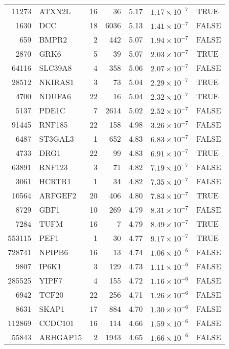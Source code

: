 \begin{table}[ht]
\begin{tabular}{rlrrrrl}
  11273 & ATXN2L &  16 &  36 & 5.17 & $1.17 \times 10^{-7}$ & TRUE \\ 
  1630 & DCC &  18 & 6036 & 5.13 & $1.41 \times 10^{-7}$ & FALSE \\ 
  659 & BMPR2 &   2 & 442 & 5.07 & $1.94 \times 10^{-7}$ & FALSE \\ 
  2870 & GRK6 &   5 &  39 & 5.07 & $2.03 \times 10^{-7}$ & TRUE \\ 
  64116 & SLC39A8 &   4 & 358 & 5.06 & $2.07 \times 10^{-7}$ & FALSE \\ 
  28512 & NKIRAS1 &   3 &  73 & 5.04 & $2.29 \times 10^{-7}$ & TRUE \\ 
  4700 & NDUFA6 &  22 &  16 & 5.04 & $2.32 \times 10^{-7}$ & TRUE \\ 
  5137 & PDE1C &   7 & 2614 & 5.02 & $2.52 \times 10^{-7}$ & FALSE \\ 
  91445 & RNF185 &  22 & 158 & 4.98 & $3.26 \times 10^{-7}$ & FALSE \\ 
  6487 & ST3GAL3 &   1 & 652 & 4.83 & $6.83 \times 10^{-7}$ & FALSE \\ 
  4733 & DRG1 &  22 &  99 & 4.83 & $6.91 \times 10^{-7}$ & TRUE \\ 
  63891 & RNF123 &   3 &  71 & 4.82 & $7.19 \times 10^{-7}$ & FALSE \\ 
  3061 & HCRTR1 &   1 &  34 & 4.82 & $7.35 \times 10^{-7}$ & FALSE \\ 
  10564 & ARFGEF2 &  20 & 406 & 4.80 & $7.83 \times 10^{-7}$ & TRUE \\ 
  8729 & GBF1 &  10 & 269 & 4.79 & $8.31 \times 10^{-7}$ & FALSE \\ 
  7284 & TUFM &  16 &   7 & 4.79 & $8.49 \times 10^{-7}$ & TRUE \\ 
  553115 & PEF1 &   1 &  30 & 4.77 & $9.17 \times 10^{-7}$ & TRUE \\ 
  728741 & NPIPB6 &  16 &  13 & 4.74 & $1.06 \times 10^{-6}$ & FALSE \\ 
  9807 & IP6K1 &   3 & 129 & 4.73 & $1.11 \times 10^{-6}$ & FALSE \\ 
  285525 & YIPF7 &   4 & 155 & 4.72 & $1.16 \times 10^{-6}$ & FALSE \\ 
  6942 & TCF20 &  22 & 256 & 4.71 & $1.26 \times 10^{-6}$ & FALSE \\ 
  8631 & SKAP1 &  17 & 884 & 4.70 & $1.30 \times 10^{-6}$ & FALSE \\ 
  112869 & CCDC101 &  16 & 114 & 4.66 & $1.59 \times 10^{-6}$ & FALSE \\ 
  55843 & ARHGAP15 &   2 & 1943 & 4.65 & $1.66 \times 10^{-6}$ & FALSE \\ 

\end{tabular}
\end{table}
